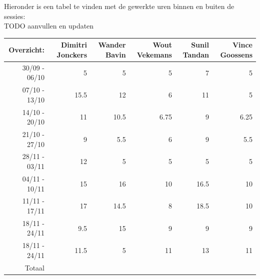 \documentclass[eind]{penoverslag}
\begin{document}
Hieronder is een tabel te vinden met de gewerkte uren binnen en buiten de sessies: \\

TODO aanvullen en updaten

\begin{tabular}{r||r|r|r|r|r}
Overzicht: & Dimitri Jonckers & Wander Bavin & Wout Vekemans & Sunil Tandan & Vince Goossens \\
\hline \hline 
30/09 - 06/10 & 5 & 5 & 5 & 7 & 5 \\
07/10 - 13/10 & 15.5 & 12 & 6 & 11 & 5 \\
14/10 - 20/10 & 11 & 10.5 & 6.75 & 9 & 6.25 \\
21/10 - 27/10 & 9 & 5.5 & 6 & 9 & 5.5 \\
28/11 - 03/11 & 12 & 5 & 5 & 5 & 5 \\
04/11 - 10/11 & 15 & 16 & 10 & 16.5 & 10 \\
11/11 - 17/11 & 17 & 14.5 & 8 & 18.5 & 10 \\
18/11 - 24/11 & 9.5 & 15 & 9 & 9 & 9 \\
18/11 - 24/11 & 11.5 & 5 & 11 & 13 & 11 \\
\hline \hline
Totaal &  &  &  &  &  \\
\end{tabular}
\end{document}
